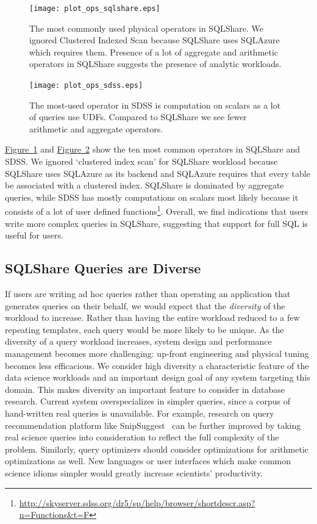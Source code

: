 \documentclass{sig-alternate}
\newcommand{\figref}[1]{\hyperref[#1]{Figure~\ref*{#1}}}
\newcommand{\sqlshare}{SQLShare}
\begin{document}
\begin{figure}[h]
\centering
\texttt{[image: plot\_ops\_sqlshare.eps]}
\vspace{-12pt}
\caption{The most commonly used physical operators in \sqlshare{}. We ignored Clustered Indexed Scan because \sqlshare{} uses SQLAzure which requires them. Presence of a lot of aggregate and arithmetic operators in \sqlshare{} suggests the presence of analytic workloads.}
\vspace{-9pt}
\label{fig:pOpssqlshare}
\end{figure}
\begin{figure}[h]
\centering
\texttt{[image: plot\_ops\_sdss.eps]}
\vspace{-14pt}
\caption{The most-used operator in SDSS is computation on scalars as a lot of queries use UDFs. Compared to \sqlshare{} we see fewer arithmetic and aggregate operators.}
\vspace{-12pt}
\label{fig:pOpsSDSS}
\end{figure}
\figref{fig:pOpssqlshare} and \figref{fig:pOpsSDSS} show the ten most common operators in \sqlshare{} and SDSS.
We ignored `clustered index scan' for \sqlshare{} workload because \sqlshare{} uses SQLAzure as its backend and SQLAzure requires that every table be associated with a clustered index.
\sqlshare{} is dominated by aggregate queries, while SDSS has mostly computations on scalars most likely because it consists of a lot of user defined functions\footnote{\url{http://skyserver.sdss.org/dr5/sp/help/browser/shortdescr.asp?n=Functions&t=F}}.
Overall, we find indications that users write more complex queries in \sqlshare{}, suggesting that support for full SQL is useful for users.

\subsection{\sqlshare{} Queries are Diverse}
\label{sec:sqlsharediverse}
If users are writing ad hoc queries rather than operating an application that generates queries on their behalf, we would expect that the \emph{diversity} of the workload to increase. Rather than having the entire workload reduced to a few repeating templates, each query would be more likely to be unique. 
As the diversity of a query workload increases, system design and performance management becomes more challenging: up-front engineering and physical tuning becomes less efficacious.  We consider high diversity a characteristic feature of the data science workloads and an important design goal of any system targeting this domain. 
This makes diversity an important feature to consider in database research. Current system overspecializes in simpler queries, since a corpus of hand-written real queries is unavailable. For example, research on query recommendation platform like SnipSuggest~\cite{snipsuggest} can be further improved by taking real science queries into consideration to reflect the full complexity of the problem. 
Similarly, query optimizers should consider optimizations for arithmetic optimizations as well. New languages or user interfaces which make common science idioms simpler would greatly increase scientists' productivity.
\end{document}
